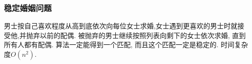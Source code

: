 \subsubsection{稳定婚姻问题}
		 男士按自己喜欢程度从高到底依次向每位女士求婚,女士遇到更喜欢的男士时就接受他,并抛弃以前的配偶. 被抛弃的男士继续按照列表向剩下的女士依次求婚, 直到所有人都有配偶. 算法一定能得到一个匹配, 而且这个匹配一定是稳定的. 时间复杂度$O(n^2)$. 

